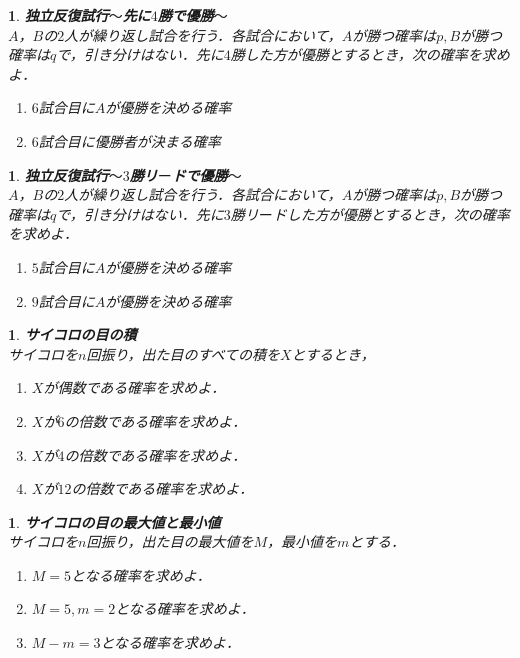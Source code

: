 \documentclass[10pt,
fleqn,
dvipdfmx,
uplatex
]{jsarticle}
\newtheorem{question}[Question]{}
\begin{document}
\begin{question}{\bf\boldmath 独立反復試行$〜$先に$4$勝で優勝$〜$}\\
$A$，$B$の$2$人が繰り返し試合を行う．各試合において，$A$が勝つ確率は$p, B$が勝つ確率は$q$で，引き分けはない．先に$4$勝した方が優勝とするとき，次の確率を求めよ．
\begin{enumerate}
\item $6$試合目に$A$が優勝を決める確率
\item $6$試合目に優勝者が決まる確率
\end{enumerate}

\end{question}



\begin{question}{\bf\boldmath 独立反復試行$〜3$勝リ$ー$ドで優勝$〜$}\\
$A$，$B$の$2$人が繰り返し試合を行う．各試合において，$A$が勝つ確率は$p, B$が勝つ確率は$q$で，引き分けはない．先に$3$勝リ$ー$ドした方が優勝とするとき，次の確率を求めよ．
\begin{enumerate}
\item $5$試合目に$A$が優勝を決める確率
\item $9$試合目に$A$が優勝を決める確率
\end{enumerate}

\end{question}



\begin{question}{\bf\boldmath サイコロの目の積}\\
サイコロを$n$回振り，出た目のすべての積を$X$とするとき，
\begin{enumerate}
\item $X$が偶数である確率を求めよ．
\item $X$が$6$の倍数である確率を求めよ．
\item $X$が$4$の倍数である確率を求めよ．
\item $X$が${12}$の倍数である確率を求めよ．
\end{enumerate}

\end{question}



\begin{question}{\bf\boldmath サイコロの目の最大値と最小値}\\
サイコロを$n$回振り，出た目の最大値を$M$，最小値を$m$とする．
\begin{enumerate}
\item $M=5$となる確率を求めよ．
\item $M=5, m=2$となる確率を求めよ．
\item $M-m=3$となる確率を求めよ．
\end{enumerate}

\end{question}
\end{document}
